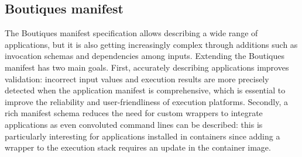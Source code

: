 \documentclass{article}
\newcommand{\boutiques}{Boutiques\xspace}
\begin{document}
\subsection{\boutiques manifest}

The \boutiques manifest specification allows describing a wide range
of applications, but it is also getting increasingly complex through
additions such as invocation schemas and dependencies among
inputs. Extending the \boutiques manifest has two main goals. First,
accurately describing applications improves validation: incorrect input
values and execution results are more precisely detected when the
application manifest is comprehensive, which is essential to improve
the reliability and user-friendliness of execution
platforms. Secondly, a rich manifest schema reduces the need for
custom wrappers to integrate applications as even convoluted command
lines can be described: this is particularly interesting for
applications installed in containers since adding a wrapper to the
execution stack requires an update in the container image.
\end{document}
